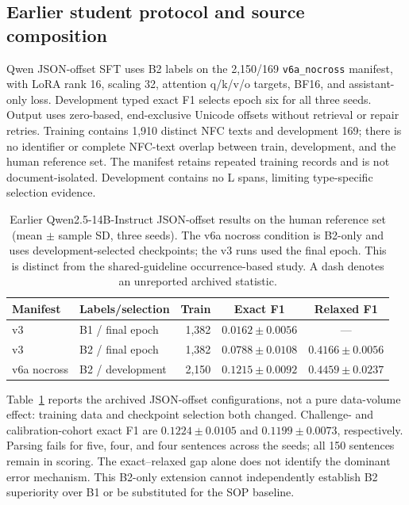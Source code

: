 \subsection{Earlier student protocol and source composition}
\label{sec:qwen-sft}
Qwen JSON-offset SFT uses B2 labels on the 2,150/169 \texttt{v6a\_nocross} manifest, with LoRA rank 16, scaling 32, attention q/k/v/o targets, BF16, and assistant-only loss. Development typed exact F1 selects epoch six for all three seeds. Output uses zero-based, end-exclusive Unicode offsets without retrieval or repair retries. Training contains 1,910 distinct NFC texts and development 169; there is no identifier or complete NFC-text overlap between train, development, and the human reference set. The manifest retains repeated training records and is not document-isolated. Development contains no L spans, limiting type-specific selection evidence.
\begin{table}[htbp]
\caption{Earlier Qwen2.5-14B-Instruct JSON-offset results on the human reference set (mean $\pm$ sample SD, three seeds). The v6a nocross condition is B2-only and uses development-selected checkpoints; the v3 runs used the final epoch. This is distinct from the shared-guideline occurrence-based study. A dash denotes an unreported archived statistic.}
\label{tab:qwen-supplement}
\centering
\small
\begin{tabular}{@{}llrcc@{}}
\toprule
Manifest & Labels/selection & Train & Exact F1 & Relaxed F1 \\
\midrule
v3 & B1 / final epoch & 1,382 & $0.0162\pm0.0056$ & --- \\
v3 & B2 / final epoch & 1,382 & $0.0788\pm0.0108$ & $0.4166\pm0.0056$ \\
v6a nocross & B2 / development & 2,150 & $0.1215\pm0.0092$ & $0.4459\pm0.0237$ \\
\bottomrule
\end{tabular}
\end{table}
\FloatBarrier
Table~\ref{tab:qwen-supplement} reports the archived JSON-offset configurations, not a pure data-volume effect: training data and checkpoint selection both changed. Challenge- and calibration-cohort exact F1 are $0.1224\pm0.0105$ and $0.1199\pm0.0073$, respectively. Parsing fails for five, four, and four sentences across the seeds; all 150 sentences remain in scoring. The exact--relaxed gap alone does not identify the dominant error mechanism. This B2-only extension cannot independently establish B2 superiority over B1 or be substituted for the SOP baseline.

